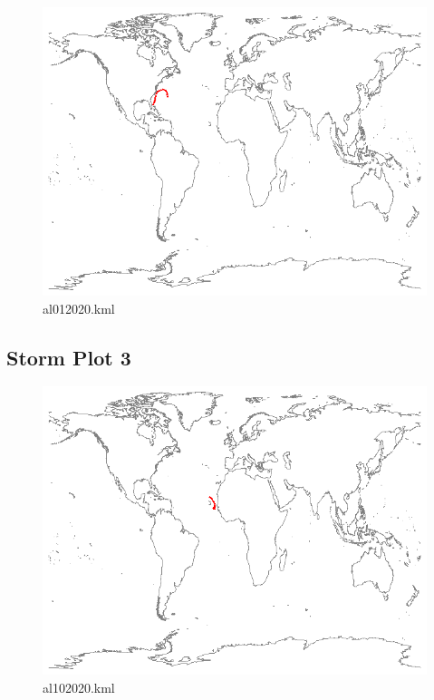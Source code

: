 \documentclass[]{article}
\begin{document}
\begin{figure}[htbp]
    \centering
\includegraphics{al012020.png}
\caption{al012020.kml}
\label{fig:al012020}
\end{figure}

\clearpage
\subsection{Storm Plot 3}

\begin{figure}[htbp]
    \centering
\includegraphics{al102020.png}
\caption{al102020.kml}
\label{fig:al102020}
\end{figure}
\clearpage
\end{document}
